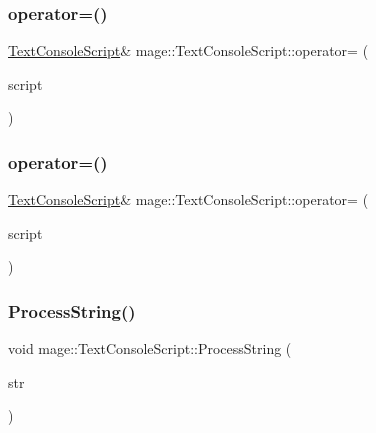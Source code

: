 \subsubsection{\texorpdfstring{operator=()}{operator=()}\hspace{0.1cm}{\footnotesize\ttfamily [1/2]}}
{\footnotesize\ttfamily \hyperlink{classmage_1_1_text_console_script}{Text\+Console\+Script}\& mage\+::\+Text\+Console\+Script\+::operator= (\begin{DoxyParamCaption}\item[{const \hyperlink{classmage_1_1_text_console_script}{Text\+Console\+Script} \&}]{script }\end{DoxyParamCaption})\hspace{0.3cm}{\ttfamily [delete]}}

\hypertarget{classmage_1_1_text_console_script_a2a14c6a981fe7ded4e7a4fa5480ac6cb}{}\label{classmage_1_1_text_console_script_a2a14c6a981fe7ded4e7a4fa5480ac6cb} 
\subsubsection{\texorpdfstring{operator=()}{operator=()}\hspace{0.1cm}{\footnotesize\ttfamily [2/2]}}
{\footnotesize\ttfamily \hyperlink{classmage_1_1_text_console_script}{Text\+Console\+Script}\& mage\+::\+Text\+Console\+Script\+::operator= (\begin{DoxyParamCaption}\item[{\hyperlink{classmage_1_1_text_console_script}{Text\+Console\+Script} \&\&}]{script }\end{DoxyParamCaption})\hspace{0.3cm}{\ttfamily [delete]}}

\hypertarget{classmage_1_1_text_console_script_ac1e1d4768ead2de82493ab487449bbd8}{}\label{classmage_1_1_text_console_script_ac1e1d4768ead2de82493ab487449bbd8} 
\subsubsection{\texorpdfstring{Process\+String()}{ProcessString()}}
{\footnotesize\ttfamily void mage\+::\+Text\+Console\+Script\+::\+Process\+String (\begin{DoxyParamCaption}\item[{const wchar\+\_\+t $\ast$}]{str }\end{DoxyParamCaption})\hspace{0.3cm}{\ttfamily [private]}}

